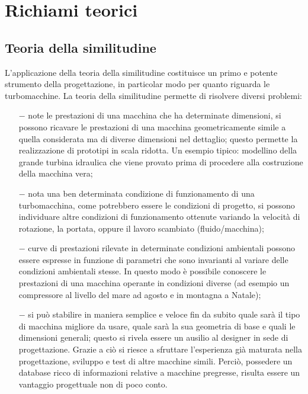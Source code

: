\chapter{Richiami teorici}
\section{Teoria della similitudine}
L’applicazione della teoria della similitudine costituisce un primo e potente strumento della progettazione, in particolar modo per quanto riguarda le turbomacchine. La teoria della similitudine permette di risolvere diversi problemi:
\begin{itemize}
\item[$-$] note le prestazioni di una macchina che ha determinate dimensioni, si possono ricavare le prestazioni di una macchina geometricamente simile a quella considerata ma di diverse dimensioni nel dettaglio; questo permette la realizzazione di prototipi in scala ridotta. Un esempio tipico: modellino della grande turbina idraulica che viene provato prima di procedere alla costruzione della macchina vera;
\item[$-$] nota una ben determinata condizione di funzionamento di una turbomacchina, come potrebbero essere le condizioni di progetto, si possono individuare altre condizioni di funzionamento ottenute variando la velocità di rotazione, la portata, oppure il lavoro scambiato (fluido/macchina);
\item[$-$] curve di prestazioni rilevate in determinate condizioni ambientali possono essere espresse in funzione di parametri che sono invarianti al variare delle condizioni ambientali stesse. In questo modo è possibile conoscere le prestazioni di una macchina operante in condizioni diverse (ad esempio un compressore al livello del mare ad agosto e in montagna a Natale);
\item[$-$]si può stabilire in maniera semplice e veloce fin da subito quale sarà il tipo di macchina migliore da usare, quale sarà la sua geometria di base e quali le dimensioni generali; questo si rivela essere un ausilio al designer in sede di progettazione. Grazie a ciò si riesce a sfruttare l’esperienza già maturata nella progettazione, sviluppo e test di altre macchine simili. Perciò, possedere un database ricco di informazioni relative a macchine pregresse, risulta essere un vantaggio progettuale non di poco conto.
\end{itemize}
